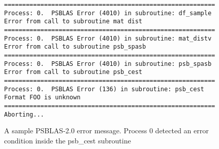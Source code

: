 \begin{figure}[h!]
  \begin{Sbox}
    \begin{minipage}[tl]{0.95\textwidth}
\begin{verbatim}
==========================================================
Process: 0.  PSBLAS Error (4010) in subroutine: df_sample           
Error from call to subroutine mat dist            
==========================================================
Process: 0.  PSBLAS Error (4010) in subroutine: mat_distv           
Error from call to subroutine psb_spasb           
==========================================================
Process: 0.  PSBLAS Error (4010) in subroutine: psb_spasb           
Error from call to subroutine psb_cest            
==========================================================
Process: 0.  PSBLAS Error (136) in subroutine: psb_cest            
Format FOO is unknown
==========================================================
Aborting...
\end{verbatim}
    \end{minipage}
  \end{Sbox}
  \setlength{\fboxsep}{8pt}
  \begin{center}
    \fbox{\TheSbox}
  \end{center}
  \caption{\label{fig:errormsg}A sample PSBLAS-2.0 error
    message. Process 0 detected an error condition inside the {\textrm
    psb\_cest} subroutine}
\end{figure}




